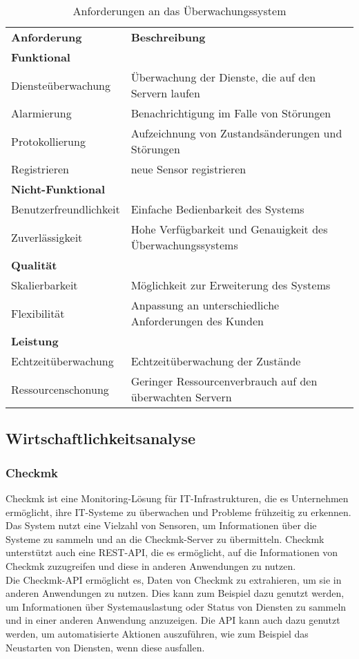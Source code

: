 \begin{flushleft}
\begin{table}[h]
	\centering
	\begin{tabular}{ l l }
	\hline
	\rowcolor{babyblue}
	\textbf{Anforderung} & \textbf{Beschreibung} \\
	\rowcolor{Gray}
	\textbf{Funktional} & \\
	Diensteüberwachung & Überwachung der Dienste, die auf den Servern laufen \\
	Alarmierung & Benachrichtigung im Falle von Störungen \\
	Protokollierung & Aufzeichnung von Zustandsänderungen und Störungen \\
	Registrieren & neue Sensor registrieren \\
	\rowcolor{Gray}
	\textbf{Nicht-Funktional} & \\
	Benutzerfreundlichkeit & Einfache Bedienbarkeit des Systems \\
	Zuverlässigkeit & Hohe Verfügbarkeit und Genauigkeit des Überwachungssystems \\
	\rowcolor{Gray}
	\textbf{Qualität} & \\
	Skalierbarkeit & Möglichkeit zur Erweiterung des Systems \\
	Flexibilität & Anpassung an unterschiedliche Anforderungen des Kunden \\
	\rowcolor{Gray}
	\textbf{Leistung} & \\
	Echtzeitüberwachung & Echtzeitüberwachung der Zustände \\
	Ressourcenschonung & Geringer Ressourcenverbrauch auf den überwachten Servern \\  \hline
	\end{tabular}
	\caption{Anforderungen an das Überwachungssystem}
\end{table}

\subsection{Wirtschaftlichkeitsanalyse}
\subsubsection{Checkmk}
Checkmk ist eine Monitoring-Lösung für IT-Infrastrukturen, die es Unternehmen ermöglicht, ihre IT-Systeme zu überwachen und Probleme frühzeitig zu erkennen.
Das System nutzt eine Vielzahl von Sensoren, um Informationen über die Systeme zu sammeln und an die Checkmk-Server zu übermitteln.
Checkmk unterstützt auch eine REST-API, die es ermöglicht, auf die Informationen von Checkmk zuzugreifen und diese in anderen Anwendungen zu nutzen.
\\
Die Checkmk-API ermöglicht es, Daten von Checkmk zu extrahieren, um sie in anderen Anwendungen zu nutzen.
Dies kann zum Beispiel dazu genutzt werden, um Informationen über Systemauslastung oder Status von Diensten zu sammeln und in einer anderen Anwendung anzuzeigen.
Die API kann auch dazu genutzt werden, um automatisierte Aktionen auszuführen, wie zum Beispiel das Neustarten von Diensten, wenn diese ausfallen.



\end{flushleft}
